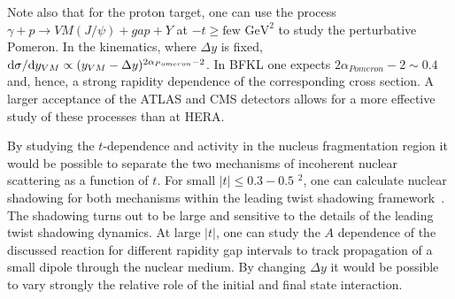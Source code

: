 \documentclass[../report.tex]{subfiles}
\begin{document}
Note also that for the proton target, one can use the process  $\gamma + p \to VM (J/\psi) + gap + Y$  at   
$-t \ge \mbox{few GeV}^2$ to study the perturbative Pomeron. 
In the kinematics, where $\Delta y$ is fixed, 
$\mathrm{d} \sigma /\mathrm{d} y_{VM} \propto (y_{VM}- \Delta y)^{2\alpha_{Pomeron}-2}$. In BFKL one expects
$2\alpha_{Pomeron}-2\sim 0.4$ and, hence, a strong rapidity dependence of the corresponding cross section. A larger acceptance of the ATLAS and CMS detectors allows for a more effective study of these processes than at HERA.


By studying the $t$-dependence and activity in the nucleus 
fragmentation region it would be possible to separate the two mechanisms of incoherent nuclear scattering as a function of $t$.
For small $|t| \le 0.3 - 0.5$ \UGeV$^2$, one can calculate nuclear shadowing for both mechanisms within the leading 
twist shadowing framework~\cite{Guzey:2013jaa}. The shadowing turns out to be large and sensitive to the details of the leading twist shadowing dynamics.  At large $|t|$, one can study the $A$ dependence of the discussed reaction for different rapidity gap  
intervals to track propagation of a small dipole through the nuclear medium.
 By changing $\Delta y$ it would be possible to vary  strongly the relative role of the initial and final state interaction.



\end{document}
